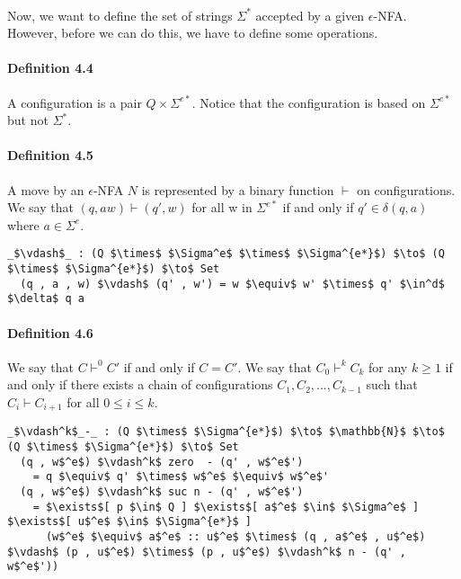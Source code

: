 \paragraph{} Now, we want to define the set of strings \(\Sigma^*\) accepted by a given
\(\epsilon\)-NFA. However, before we can do this, we have to define
some operations.

\paragraph{Definition 4.4} A configuration is a pair \(Q \times
\Sigma^{e*}\). Notice that the configuration is based on
\(\Sigma^{e*}\) but not \(\Sigma^*\).

\paragraph{Definition 4.5} A move by an \(\epsilon\)-NFA \(N\) is
represented by a binary function \(\vdash\) on configurations. We say
that \((q, aw) \vdash (q' , w)\) for all w in \(\Sigma^{e*}\)
if and only if \(q' \in \delta (q , a)\) where \(a \in \Sigma^e\). 

\begin{lstlisting}[mathescape=true]
  _$\vdash$_ : (Q $\times$ $\Sigma^e$ $\times$ $\Sigma^{e*}$) $\to$ (Q $\times$ $\Sigma^{e*}$) $\to$ Set
  (q , a , w) $\vdash$ (q' , w') = w $\equiv$ w' $\times$ q' $\in^d$ $\delta$ q a
\end{lstlisting}

\paragraph{Definition 4.6} We say that \(C \vdash^0 C'\) if and only
if \(C = C'\). We say that \(C_0 \vdash^k C_k\) for any \(k \geq 1\) if and only if there exists a chain of
configurations \(C_1, C_2, ..., C_{k-1}\) such that \(C_i \vdash
C_{i+1}\) for all \(0 \leq i \leq k\). 

\begin{lstlisting}[mathescape=true]
  _$\vdash^k$_-_ : (Q $\times$ $\Sigma^{e*}$) $\to$ $\mathbb{N}$ $\to$ (Q $\times$ $\Sigma^{e*}$) $\to$ Set
  (q , w$^e$) $\vdash^k$ zero  - (q' , w$^e$')
    = q $\equiv$ q' $\times$ w$^e$ $\equiv$ w$^e$'
  (q , w$^e$) $\vdash^k$ suc n - (q' , w$^e$') 
    = $\exists$[ p $\in$ Q ] $\exists$[ a$^e$ $\in$ $\Sigma^e$ ] $\exists$[ u$^e$ $\in$ $\Sigma^{e*}$ ]
      (w$^e$ $\equiv$ a$^e$ :: u$^e$ $\times$ (q , a$^e$ , u$^e$) $\vdash$ (p , u$^e$) $\times$ (p , u$^e$) $\vdash^k$ n - (q' , w$^e$'))
\end{lstlisting}

